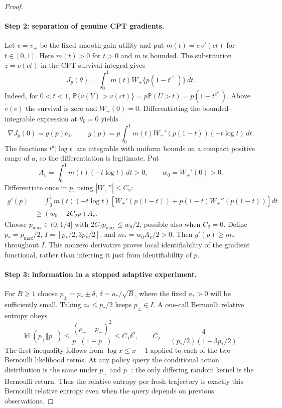 \documentclass[11pt]{article}
\newcommand{\Pp}{\mathbb P}
\newcommand{\1}{\mathbf 1}
\theoremstyle{definition}
\begin{document}
\begin{proof}
\paragraph{Step 2: separation of genuine CPT gradients.}
Let $v=v_+$ be the fixed smooth gain utility and put $m(t)=c\,v'(ct)$ for $t\in[0,1]$. Here $m(t)>0$ for $t>0$ and $m$ is bounded. The substitution $z=v(ct)$ in the CPT survival integral gives
\begin{equation}\label{eq:submodel-cpt}
 J_p(\theta)=\int_0^1 m(t)W_+\{p(1-t^{e^{\theta_1}})\}\,dt.
\end{equation}
Indeed, for $0<t<1$, $\Pp\{v(Y)>v(ct)\}=p\Pp(U>t)=p(1-t^{e^{\theta_1}})$. Above $v(c)$ the survival is zero and $W_+(0)=0$. Differentiating the bounded-integrable expression at $\theta_0=0$ yields
\begin{equation}\label{eq:submodel-gradient}
 \nabla J_p(0)=g(p)e_1,\qquad
 g(p)=p\int_0^1m(t)W_+'(p(1-t))(-t\log t)\,dt.
\end{equation}
The functions $t^a|\log t|$ are integrable with uniform bounds on a compact positive range of $a$, so the differentiation is legitimate. Put
\[
 A_v=\int_0^1m(t)(-t\log t)\,dt>0,
 \qquad w_0=W_+'(0)>0.
\]
Differentiate once in $p$, using $|W_+''|\le C_2$:
\begin{align*}
 g'(p)&=\int_0^1m(t)(-t\log t)
 [W_+'(p(1-t))+p(1-t)W_+''(p(1-t))]dt\\
 &\ge (w_0-2C_2p)A_v.
\end{align*}
Choose $p_{\max}\in(0,1/4]$ with $2C_2p_{\max}\le w_0/2$, possible also when $C_2=0$. Define $p_*=p_{\max}/2$, $I=[p_*/2,3p_*/2]$, and $m_*=w_0 A_v/2>0$. Then $g'(p)\ge m_*$ throughout $I$. This nonzero derivative proves local identifiability of the gradient functional, rather than inferring it just from identifiability of $p$.

\paragraph{Step 3: information in a stopped adaptive experiment.}
For $B\ge1$ choose $p_\pm=p_*\pm\delta$, $\delta=a_*/\sqrt B$, where the fixed $a_*>0$ will be sufficiently small. Taking $a_*\le p_*/2$ keeps $p_\pm\in I$. A one-call Bernoulli relative entropy obeys
\[
 \operatorname{kl}(p_+\Vert p_-)
 \le\frac{(p_+-p_-)^2}{p_-(1-p_-)}
 \le C_I\delta^2,
 \qquad C_I=\frac{4}{(p_*/2)(1-3p_*/2)}.
\]
The first inequality follows from $\log x\le x-1$ applied to each of the two Bernoulli likelihood terms. At any policy query the conditional action distribution is the same under $p_+$ and $p_-$; the only differing random kernel is the Bernoulli return. Thus the relative entropy per fresh trajectory is exactly this Bernoulli relative entropy even when the query depends on previous observations.


\end{proof}
\end{document}
